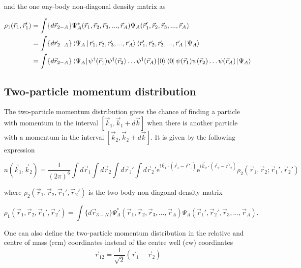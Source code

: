 \documentclass[12pt]{article}
\begin{document}
and the one ony-body non-diagonal density matrix as

\begin{align}
\rho_1(\vec{r}_1,\vec{r}'_1) & = \int \{d\vec{r}_{2-A}\} \Psi^*_A(\vec{r}_1,\vec{r}_2,\vec{r}_3, ... ,\vec{r}_A)\Psi_A(\vec{r}_1',\vec{r}_2,\vec{r}_3, ... ,\vec{r}_A) \\
& = \int \{d\vec{r}_{2-A}\} \Braket{\Psi_A|\vec{r}_1,\vec{r}_2,\vec{r}_3, ... ,\vec{r}_A} 
\Braket{\vec{r}_1',\vec{r}_2,\vec{r}_3, ... ,\vec{r}_A|\Psi_A} \\
& = \int \{d\vec{r}_{2-A}\} \bra{\Psi_A} \psi^\dagger(\vec{r}_1) \psi^\dagger(\vec{r}_2) \ldots \psi^\dagger(\vec{r}_A) \ket{0} 
\bra{0} \psi(\vec{r}_1) \psi(\vec{r}_2) \ldots \psi(\vec{r}_A)  \ket{\Psi_A} 
\end{align}




\subsection{Two-particle momentum distribution}

The two-particle momentum distribution gives the chance of finding a particle with momentum in the interval $[\vec{k}_1,\vec{k}_1+d\vec{k}]$ when there is another particle with a momentum in the interval $[\vec{k}_2,\vec{k}_2+d\vec{k}]$. It is given by the following expression

\begin{equation}
n(\vec{k}_1,\vec{k}_2)=\frac{1}{(2\pi)^6}\int d\vec{r}_1 \int d\vec{r}_2 \int  
    						d\vec{r}_1' \int d\vec{r}_2' 
    						\mathrm{e}^{i\vec{k}_1\cdot (\vec{r}_1-\vec{r}'_1)} 
    						\mathrm{e}^{i\vec{k}_2\cdot(\vec{r}_2-\vec{r}'_2)}
    						\rho_2(\vec{r}_1,\vec{r}_2; \vec{r}_1',\vec{r}_2')
\end{equation}

where $\rho_2(\vec{r}_1,\vec{r}_2, \vec{r}_1',\vec{r}_2')$ is the two-body non-diagonal density matrix


\begin{equation}
\rho_1(\vec{r}_1,\vec{r}_2, \vec{r}_1',\vec{r}_2') = \int \{d\vec{r}_{3-N}\} \Psi^*_A(\vec{r}_1,\vec{r}_2,\vec{r}_3, ... ,\vec{r}_A)\Psi_A(\vec{r}_1',\vec{r}_2',\vec{r}_3, ... ,\vec{r}_A).
\end{equation}

One can also define the two-particle momentum distribution in the relative and centre of mass (rcm) coordinates instead of the centre well (cw) coordinates
\begin{equation}
\vec{r}_{12}= \frac{1}{\sqrt{2}} \left(\vec{r}_1 - \vec{r}_2\right)  
\end{equation}
\end{document}
